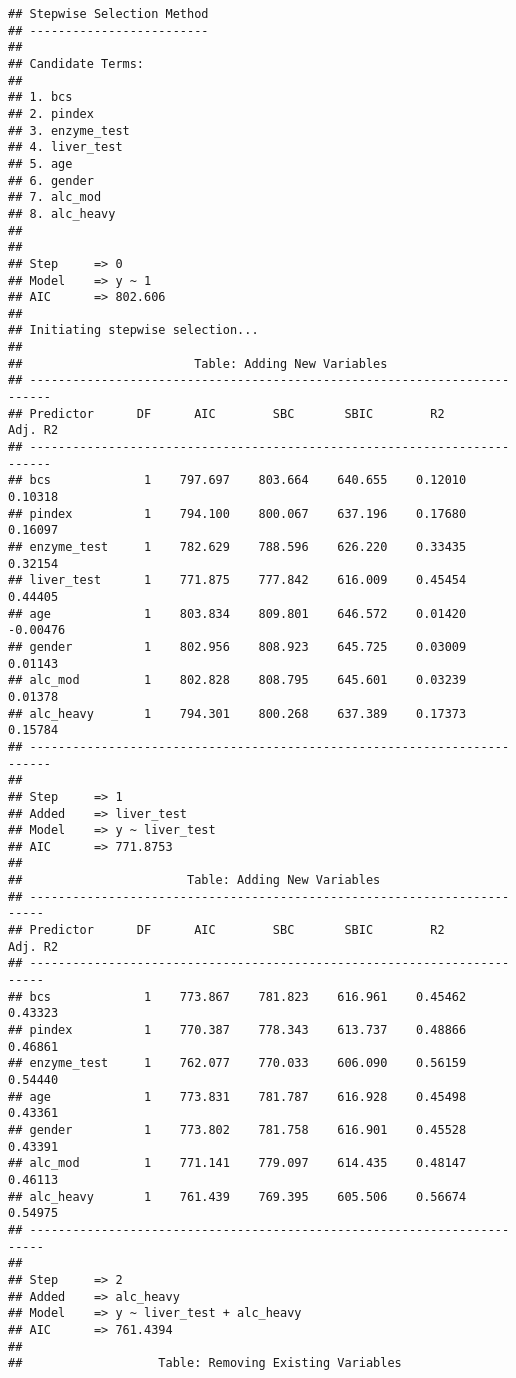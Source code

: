 \documentclass[
]{article}
\begin{document}
\begin{verbatim}
## Stepwise Selection Method 
## -------------------------
## 
## Candidate Terms: 
## 
## 1. bcs 
## 2. pindex 
## 3. enzyme_test 
## 4. liver_test 
## 5. age 
## 6. gender 
## 7. alc_mod 
## 8. alc_heavy 
## 
## 
## Step     => 0 
## Model    => y ~ 1 
## AIC      => 802.606 
## 
## Initiating stepwise selection... 
## 
##                        Table: Adding New Variables                        
## -------------------------------------------------------------------------
## Predictor      DF      AIC        SBC       SBIC        R2       Adj. R2  
## -------------------------------------------------------------------------
## bcs             1    797.697    803.664    640.655    0.12010     0.10318 
## pindex          1    794.100    800.067    637.196    0.17680     0.16097 
## enzyme_test     1    782.629    788.596    626.220    0.33435     0.32154 
## liver_test      1    771.875    777.842    616.009    0.45454     0.44405 
## age             1    803.834    809.801    646.572    0.01420    -0.00476 
## gender          1    802.956    808.923    645.725    0.03009     0.01143 
## alc_mod         1    802.828    808.795    645.601    0.03239     0.01378 
## alc_heavy       1    794.301    800.268    637.389    0.17373     0.15784 
## -------------------------------------------------------------------------
## 
## Step     => 1 
## Added    => liver_test 
## Model    => y ~ liver_test 
## AIC      => 771.8753 
## 
##                       Table: Adding New Variables                        
## ------------------------------------------------------------------------
## Predictor      DF      AIC        SBC       SBIC        R2       Adj. R2 
## ------------------------------------------------------------------------
## bcs             1    773.867    781.823    616.961    0.45462    0.43323 
## pindex          1    770.387    778.343    613.737    0.48866    0.46861 
## enzyme_test     1    762.077    770.033    606.090    0.56159    0.54440 
## age             1    773.831    781.787    616.928    0.45498    0.43361 
## gender          1    773.802    781.758    616.901    0.45528    0.43391 
## alc_mod         1    771.141    779.097    614.435    0.48147    0.46113 
## alc_heavy       1    761.439    769.395    605.506    0.56674    0.54975 
## ------------------------------------------------------------------------
## 
## Step     => 2 
## Added    => alc_heavy 
## Model    => y ~ liver_test + alc_heavy 
## AIC      => 761.4394 
## 
##                   Table: Removing Existing Variables                    

\end{verbatim}
\end{document}
